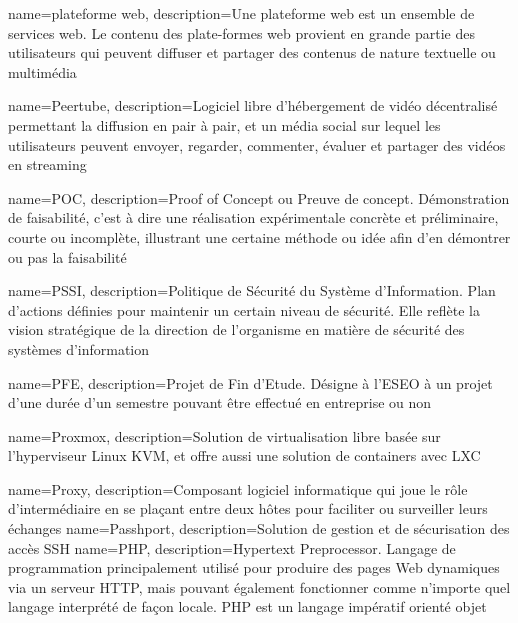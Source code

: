 {
    name=plateforme web,
    description={Une plateforme web est un ensemble de services web. Le contenu des plate-formes web provient en grande partie des utilisateurs qui peuvent diffuser et partager des contenus de nature textuelle ou multimédia}
}

{
    name=Peertube,
    description={Logiciel libre d'hébergement de vidéo décentralisé permettant la diffusion en pair à pair, et un média social sur lequel les utilisateurs peuvent envoyer, regarder, commenter, évaluer et partager des vidéos en streaming}
}

{
    name=POC,
    description={Proof of Concept ou Preuve de concept. Démonstration de faisabilité, c'est à dire une réalisation expérimentale concrète et préliminaire, courte ou incomplète, illustrant une certaine méthode ou idée afin d'en démontrer ou pas la faisabilité}
}

{
    name=PSSI,
    description={Politique de Sécurité du Système d'Information. Plan d'actions définies pour maintenir un certain niveau de sécurité. Elle reflète la vision stratégique de la direction de l'organisme en matière de sécurité des systèmes d'information}
}

{
    name=PFE,
    description={Projet de Fin d'Etude. Désigne à l'ESEO à un projet d'une durée d'un semestre pouvant être effectué en entreprise ou non}
}

{
    name=Proxmox,
    description={Solution de virtualisation libre basée sur l'hyperviseur Linux KVM, et offre aussi une solution de containers avec LXC}
}

{
    name=Proxy,
    description={Composant logiciel informatique qui joue le rôle d'intermédiaire en se plaçant entre deux hôtes pour faciliter ou surveiller leurs échanges}
}
{
    name=Passhport,
    description={Solution de gestion et de sécurisation des accès SSH}
}
{
    name=PHP,
    description={Hypertext Preprocessor. Langage de programmation principalement utilisé pour produire des pages Web dynamiques via un serveur HTTP, mais pouvant également fonctionner comme n'importe quel langage interprété de façon locale. PHP est un langage impératif orienté objet}
}




